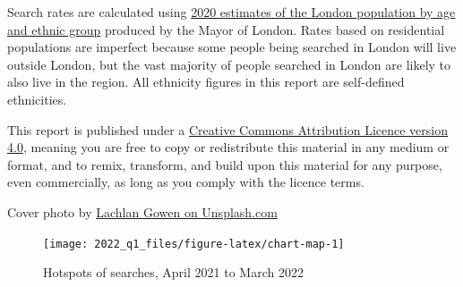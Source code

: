 \documentclass[
  a4paper,
  twoside, 11pt]{article}
\begin{document}
Search rates are calculated using \href{https://data.london.gov.uk/dataset/ethnic-group-population-projections}{2020 estimates of the London population by age and ethnic group} produced by the Mayor of London. Rates based on residential populations are imperfect because some people being searched in London will live outside London, but the vast majority of people searched in London are likely to also live in the region. All ethnicity figures in this report are self-defined ethnicities.

This report is published under a \href{https://creativecommons.org/licenses/by/4.0/}{Creative Commons Attribution Licence version 4.0}, meaning you are free to copy or redistribute this material in any medium or format, and to remix, transform, and build upon this material for any purpose, even commercially, as long as you comply with the licence terms.

Cover photo by \href{https://unsplash.com/photos/RZ5TKFpdaWM}{Lachlan Gowen on Unsplash.com}




\begin{figure}[tb]

{\centering \texttt{[image: 2022\_q1\_files/figure-latex/chart-map-1]} 

}

\caption{Hotspots of searches, April 2021 to March 2022}\label{fig:chart-map}
\end{figure}

\restoregeometry
\end{document}
